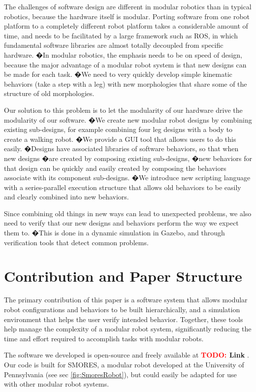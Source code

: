 \documentclass[conference]{IEEEtran}
\theoremstyle{definition}
\newcommand{\TODO}[1]{ {\bf \textcolor{red}{TODO:} #1 }}
\begin{document}
The challenges of software design are different in modular robotics than
in typical robotics, because the hardware itself is modular. Porting software
from one robot platform to a completely different robot platform takes a
considerable amount of time, and needs to be facilitated by a large framework
such as ROS, in which fundamental software libraries are almost totally decoupled from
specific hardware. �In modular robotics, the emphasis needs to be on speed of
design, because the major advantage of a modular robot system is that new
designs can be made for each task. �We need to  very quickly develop simple kinematic
behaviors (take a step with a leg) with new morphologies that share some of the
structure of old morphologies.

Our solution to this problem is to let the modularity of our hardware drive the
modularity of our software. �We create new modular robot designs by combining existing sub-designs,
for example combining four leg designs with a body to create a walking robot.
�We provide a GUI tool that allows users to do this easily. �Designs have
associated libraries of software behaviors, so that when new designs �are created
by composing existing sub-designs, �new behaviors for that design can be quickly
and easily created by composing the behaviors associate with its component
sub-designs. �We introduce new scripting language with a series-parallel
execution structure that allows old behaviors to be easily and clearly combined
into new behaviors.

Since combining old things in new ways can lead to unexpected problems, we also
need to verify that our new designs and behaviors perform the way we expect them
to. �This is done in a dynamic simulation in Gazebo, and through
verification tools that detect common problems.


\section{Contribution and Paper Structure}

The primary contribution of this paper is a software system that allows modular
robot configurations and behaviors to be built hierarchically, and a simulation
environment that helps the user verify intended behavior.  Together, these tools
help manage the complexity of a modular robot system, significantly reducing the
time and effort required to accomplish tasks with modular robots.

The software we developed is open-source and freely available at\TODO{Link}.  Our
code is built for SMORES,  a modular robot developed at the University of
Pennsylvania (see sec \ref{fig:SmoresRobot}), but could easily be adapted for use with
other modular robot systems.
\end{document}

